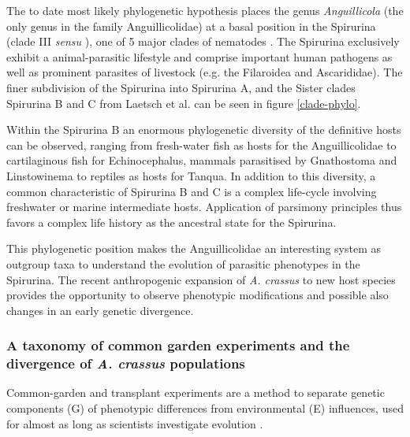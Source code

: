 The to date most likely phylogenetic hypothesis places the genus
\textit{Anguillicola} (the only genus in the family Anguillicolidae)
at a basal position in the Spirurina (clade III \textit{sensu}
\cite{blaxter_molecular_1998}), one of 5 major clades of nematodes
\cite{nadler_molecular_2007, wijov_evolutionary_2006}. The Spirurina
exclusively exhibit a animal-parasitic lifestyle and comprise
important human pathogens as well as prominent parasites of livestock
(e.g. the Filaroidea and Ascarididae). The finer subdivision of the
Spirurina into Spirurina A, and the Sister clades Spirurina B and C
from Laetsch et al. can be seen in figure \ref{clade-phylo}.


Within the Spirurina B an enormous phylogenetic diversity of the
definitive hosts can be observed, ranging from fresh-water fish as
hosts for the Anguillicolidae to cartilaginous fish for
Echinocephalus, mammals parasitised by Gnathostoma and Linstowinema to
reptiles as hosts for Tanqua. In addition to this diversity, a common
characteristic of Spirurina B and C is a complex life-cycle involving
freshwater or marine intermediate hosts. Application of parsimony
principles thus favors a complex life history as the ancestral state
for the Spirurina.

This phylogenetic position makes the Anguillicolidae an interesting
system as outgroup taxa to understand the evolution of parasitic
phenotypes in the Spirurina. The recent anthropogenic expansion of
\textit{A. crassus} to new host species provides the opportunity to
observe phenotypic modifications and possible also changes in an early
genetic divergence.


\subsubsection{A taxonomy of common garden experiments and the
  divergence of \textit{A. crassus} populations}
\label{div-ac}

Common-garden and transplant experiments are a method to separate
genetic components (G) of phenotypic differences from environmental
(E) influences, used for almost as long as scientists investigate
evolution \cite{kerner_classic_common_garden,
  bonnier_classic_common_garden}.

